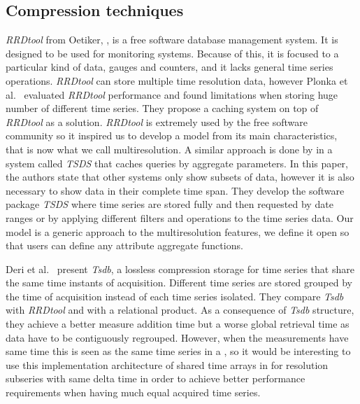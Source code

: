 \subsection{Compression techniques}





\emph{RRDtool} from Oetiker, \cite{rrdtool,lisa98:oetiker}, is a free
software database management system. It is designed to be used for
monitoring systems. Because of this, it is focused to a particular
kind of data, gauges and counters, and it lacks general time series
operations. \emph{RRDtool} can store multiple time resolution data,
however Plonka et al.\ \cite{lisa07:plonka} evaluated \emph{RRDtool}
performance and found limitations when storing huge number of
different time series. They propose a caching system on top of
\emph{RRDtool} as a solution.  \emph{RRDtool} is extremely used by the
free software community so it inspired us to develop a model from its
main characteristics, that is now what we call multiresolution. A
similar approach is done by \cite{weigel10} in a system called
\emph{TSDS} that caches queries by aggregate parameters.  In this
paper, the authors state that other systems only show subsets of data,
however it is also necessary to show data in their complete time span.
They develop the software package \emph{TSDS} where time series are
stored fully and then requested by date ranges or by applying
different filters and operations to the time series data.  Our
 model is a generic approach to the multiresolution
features, we define it open so that users can define any attribute
aggregate functions.


Deri et al.\ \cite{deri12:tsdb_compressed_database} present
\emph{Tsdb}, a lossless compression storage  for time
series that share the same time instants of acquisition. Different
time series are stored grouped by the time of acquisition instead of
each time series isolated.  They compare \emph{Tsdb} with
\emph{RRDtool} and with a relational product. As a consequence of
\emph{Tsdb} structure, they achieve a better measure addition time but
a worse global retrieval time as data have to be contiguously
regrouped. However, when the measurements have same time this is seen
as the same time series in a , so it would be interesting
to use this implementation architecture of shared time arrays in
 for resolution subseries with same delta time in order to
achieve better performance requirements when having much equal
acquired time series.


